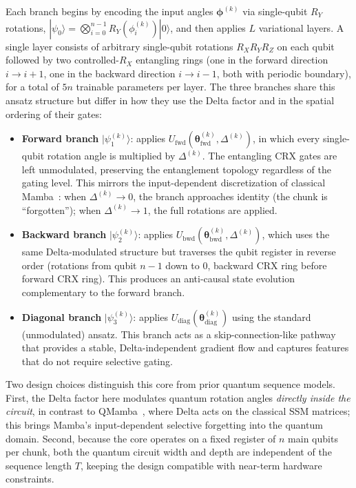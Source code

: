 \documentclass[conference]{IEEEtran}
\begin{document}
Each branch begins by encoding the input angles $\boldsymbol{\phi}^{(k)}$ via single-qubit $R_Y$ rotations, $|\psi_0\rangle = \bigotimes_{i=0}^{n-1} R_Y(\phi_i^{(k)})|0\rangle$, and then applies $L$ variational layers.
A single layer consists of arbitrary single-qubit rotations $R_X R_Y R_Z$ on each qubit followed by two controlled-$R_X$ entangling rings (one in the forward direction $i \to i{+}1$, one in the backward direction $i \to i{-}1$, both with periodic boundary), for a total of $5n$ trainable parameters per layer.
The three branches share this ansatz structure but differ in how they use the Delta factor and in the spatial ordering of their gates:
\begin{itemize}
    \item \textbf{Forward branch} $|\psi_1^{(k)}\rangle$: applies $U_{\text{fwd}}(\boldsymbol{\theta}_{\text{fwd}}^{(k)}, \Delta^{(k)})$, in which every single-qubit rotation angle is multiplied by $\Delta^{(k)}$. The entangling CRX gates are left unmodulated, preserving the entanglement topology regardless of the gating level. This mirrors the input-dependent discretization of classical Mamba~\cite{Gu2024}: when $\Delta^{(k)} \to 0$, the branch approaches identity (the chunk is ``forgotten''); when $\Delta^{(k)} \to 1$, the full rotations are applied.
    \item \textbf{Backward branch} $|\psi_2^{(k)}\rangle$: applies $U_{\text{bwd}}(\boldsymbol{\theta}_{\text{bwd}}^{(k)}, \Delta^{(k)})$, which uses the same Delta-modulated structure but traverses the qubit register in reverse order (rotations from qubit $n{-}1$ down to $0$, backward CRX ring before forward CRX ring). This produces an anti-causal state evolution complementary to the forward branch.
    \item \textbf{Diagonal branch} $|\psi_3^{(k)}\rangle$: applies $U_{\text{diag}}(\boldsymbol{\theta}_{\text{diag}}^{(k)})$ using the standard (unmodulated) ansatz. This branch acts as a skip-connection-like pathway that provides a stable, Delta-independent gradient flow and captures features that do not require selective gating.
\end{itemize}

Two design choices distinguish this core from prior quantum sequence models. First, the Delta factor here modulates quantum rotation angles \emph{directly inside the circuit}, in contrast to QMamba~\cite{Stenzel2025}, where Delta acts on the classical SSM matrices; this brings Mamba's input-dependent selective forgetting into the quantum domain. Second, because the core operates on a fixed register of $n$ main qubits per chunk, both the quantum circuit width and depth are independent of the sequence length $T$, keeping the design compatible with near-term hardware constraints.
\end{document}
